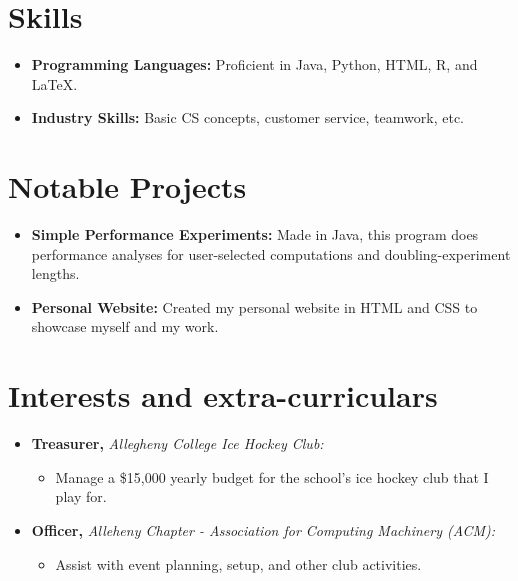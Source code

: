\documentclass[11pt,a4paper,sans]{moderncv}
\begin{document}
\section{Skills}

\vspace{3pt}

\begin{itemize} %
\item \textbf{Programming Languages:} Proficient in Java, Python, HTML, R, and LaTeX.
\vspace{6pt}
\item \textbf{Industry Skills:} Basic CS concepts, customer service, teamwork, etc.
\end{itemize} %


\section{Notable Projects}

\vspace{3pt}

\begin{itemize} %
\item \textbf{Simple Performance Experiments:} Made in Java, this program does performance analyses for user-selected computations and doubling-experiment lengths.
\item \textbf{Personal Website:} Created my personal website in HTML and CSS to showcase myself and my work.
\end{itemize} %


\section{Interests and extra-curriculars}
\vspace{3pt}

\begin{itemize} %
\item \textbf{Treasurer,} \textit{Allegheny College Ice Hockey Club:}
\begin{itemize} %
  \item Manage a \$15,000 yearly budget for the school's ice hockey club that I play for.
\end{itemize} %
\item \textbf{Officer,} \textit{Alleheny Chapter - Association for Computing Machinery (ACM): }
\begin{itemize} %
  \item Assist with event planning, setup, and other club activities.
\end{itemize} %
\end{itemize} %
\end{document}
